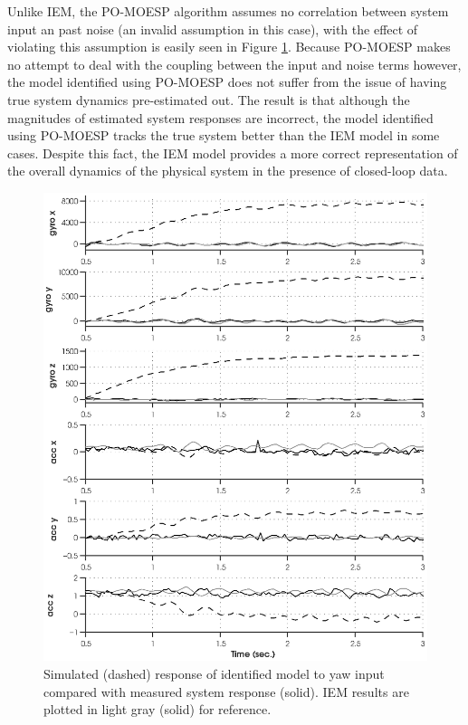 Unlike IEM, the PO-MOESP algorithm assumes no correlation between system input an past noise (an invalid assumption in this case), with the effect of violating this assumption is easily seen in Figure \ref{sim_1760_moesp.eps}. Because PO-MOESP makes no attempt to deal with the coupling between the input and noise terms however, the model identified using PO-MOESP does not suffer from the issue of having true system dynamics pre-estimated out. The result is that although the magnitudes of estimated system responses are incorrect, the model identified using PO-MOESP tracks the true system better than the IEM model in some cases. Despite this fact, the IEM model provides a more correct representation of the overall dynamics of the physical system in the presence of closed-loop data.

\newpage
\begin{figure}[htb!]
	\centering
	\includegraphics{../fig/sim_1760_moesp.eps}
	\caption{Simulated (dashed) response of identified model to yaw input compared with measured system response (solid). IEM results are plotted in light gray (solid) for reference.}
	\label{sim_1760_moesp.eps}
\end{figure}\clearpage











